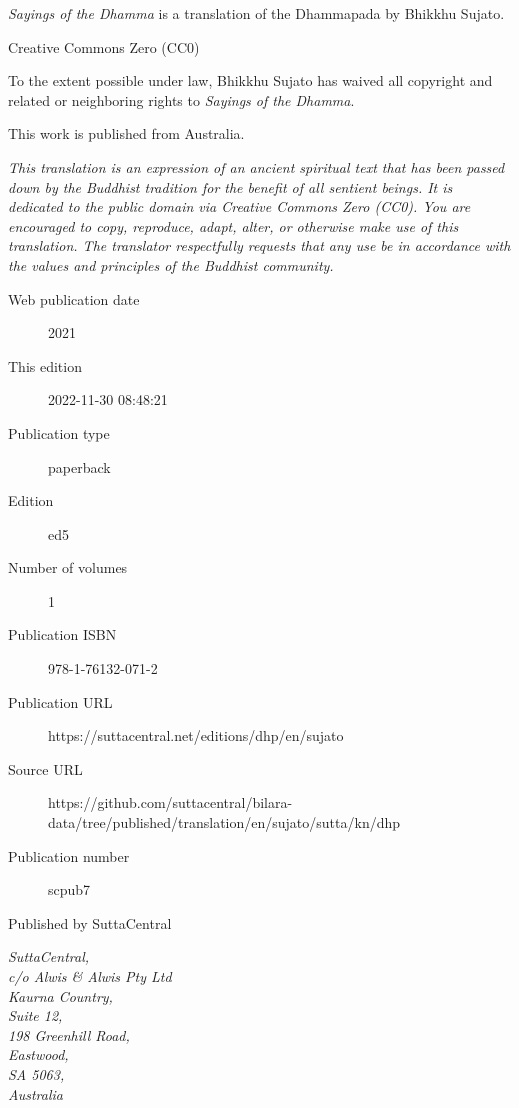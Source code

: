 \documentclass[12pt,openany]{book}%
\begin{document}
\begin{footnotesize}

\textit{Sayings of the Dhamma} is a translation of the Dhammapada by Bhikkhu Sujato.

\medskip

Creative Commons Zero (CC0)

To the extent possible under law, Bhikkhu Sujato has waived all copyright and related or neighboring rights to \textit{Sayings of the Dhamma}.

\medskip

This work is published from Australia.

\begin{center}
\textit{This translation is an expression of an ancient spiritual text that has been passed down by the Buddhist tradition for the benefit of all sentient beings. It is dedicated to the public domain via Creative Commons Zero (CC0). You are encouraged to copy, reproduce, adapt, alter, or otherwise make use of this translation. The translator respectfully requests that any use be in accordance with the values and principles of the Buddhist community.}
\end{center}

\medskip

\begin{description}
    \item[Web publication date] 2021
    \item[This edition] 2022-11-30 08:48:21
    \item[Publication type] paperback
    \item[Edition] ed5
    \item[Number of volumes] 1
    \item[Publication ISBN] 978-1-76132-071-2
    \item[Publication URL] https://suttacentral.net/editions/dhp/en/sujato
    \item[Source URL] https://github.com/suttacentral/bilara-data/tree/published/translation/en/sujato/sutta/kn/dhp
    \item[Publication number] scpub7
\end{description}

\medskip

Published by SuttaCentral

\medskip

\textit{SuttaCentral,\\
c/o Alwis \& Alwis Pty Ltd\\
Kaurna Country,\\
Suite 12,\\
198 Greenhill Road,\\
Eastwood,\\
SA 5063,\\
Australia}

\end{footnotesize}
\end{document}
